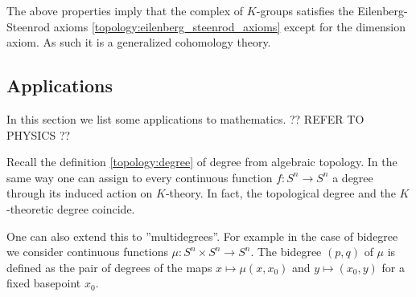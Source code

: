 {    \begin{remark}
        The above properties imply that the complex of $K$-groups satisfies the Eilenberg-Steenrod axioms \ref{topology:eilenberg_steenrod_axioms} except for the dimension axiom. As such it is a generalized cohomology theory.
    \end{remark}

\subsection{Applications}

    In this section we list some applications to mathematics. ?? REFER TO PHYSICS ??

    \begin{property}[Degree]
        Recall the definition \ref{topology:degree} of degree from algebraic topology. In the same way one can assign to every continuous function $f:S^n\rightarrow S^n$ a degree through its induced action on $K$-theory. In fact, the topological degree and the $K$-theoretic degree coincide.

        One can also extend this to ''multidegrees''. For example in the case of bidegree we consider continuous functions $\mu:S^n\times S^n\rightarrow S^n$. The bidegree $(p,q)$ of $\mu$ is defined as the pair of degrees of the maps $x\mapsto\mu(x, x_0)$ and $y\mapsto(x_0, y)$ for a fixed basepoint $x_0$.
    \end{property}


}
